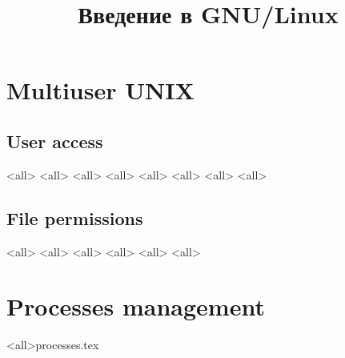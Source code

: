 

\title{Введение в GNU/Linux}





\begin{frame}
	\frametitle{}
	\titlepage
	\vspace{-0.5cm}
	\begin{center}
	\end{center}
\end{frame}



\section{Multiuser UNIX}
\subsection{User access}
\mode<all>{}
\mode<all>{}
\mode<all>{}
\mode<all>{}
\mode<all>{}
\mode<all>{}
\mode<all>{}
\mode<all>{}
\subsection{File permissions}
\mode<all>{}
\mode<all>{}
\mode<all>{}
\mode<all>{}
\mode<all>{}
\mode<all>{}
\section{Processes management}
\mode<all>{{processes.tex}}
